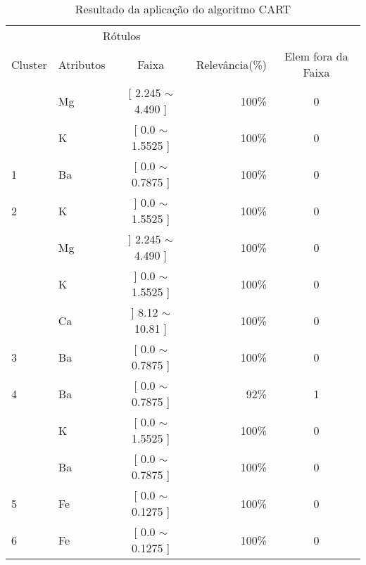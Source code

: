 \begin{table}[!h]
\centering
\caption{Resultado da aplicação do algoritmo CART}
\label{tab:rot:glass:cart}
\begin{tabular}{llcrc} 
\hline \hline
 
\multicolumn{1}{c}{\cellcolor[HTML]{FFFFFF}} & \multicolumn{2}{c}{Rótulos}                & \multicolumn{1}{r}{}               & \\ \cline{2-3}
Cluster                                      & Atributos      & \multicolumn{1}{c}{Faixa} & \multicolumn{1}{c}{Relevância(\%)} & Elem fora da Faixa\\ \hline \hline
                                             & Mg    & [ 2.245 $\sim$  4.490     ]       & 100\%                               & 0 \\
                                             & K     & [ 0.0 $\sim$  1.5525      ]       & 100\%                               & 0 \\  
\multirow{-3}{*}{1}                          & Ba    & [ 0.0 $\sim$  0.7875     ]       & 100\%                               & 0 \\  \hline
2                                            & K     & ] 0.0 $\sim$  1.5525 ]           & 100\%                               & 0\\  \hline
                                            & Mg     & ]  2.245 $\sim$  4.490  ]              & 100\%                               & 0\\ 
                                            & K     & ] 0.0 $\sim$  1.5525 ]               & 100\%                               & 0\\  
                                            & Ca     & ] 8.12 $\sim$  10.81 ]       & 100\%                               & 0\\ 
\multirow{-3}{*}{3}                          & Ba    & [ 0.0 $\sim$  0.7875     ]       & 100\%                               & 0 \\  \hline
4                                           & Ba    & [ 0.0 $\sim$  0.7875     ]       & 92\%                               & 1 \\  \hline
                                            & K     & [ 0.0 $\sim$  1.5525      ]       & 100\%                               & 0 \\  
                                            & Ba    & [ 0.0 $\sim$  0.7875     ]       & 100\%                               & 0 \\   
\multirow{-3}{*}{5}                          & Fe    & [ 0.0 $\sim$  0.1275     ]       & 100\%                               & 0 \\  \hline
6                                            & Fe    & [ 0.0 $\sim$  0.1275     ]       & 100\%                               & 0\\  \hline

\hline

\end{tabular}
\end{table}
